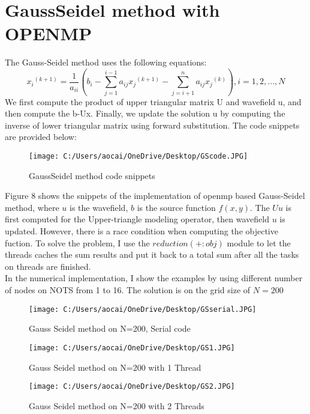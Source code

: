 \documentclass[12pt]{article}
\begin{document}
\section{GaussSeidel method with OPENMP}
The Gauss-Seidel method uses the following equations:
$${x_i}^{(k+1)} = \frac{1}{a_{ii}} \left( b_i - \sum_{j=1}^{i-1}a_{ij}{x_j}^{(k+1)} -\sum_{j=i+1}^{n}a_{ij}{x_j}^{(k)} \right), i= 1,2,...,N$$
We first compute the product of upper triangular matrix U and wavefield u, and then compute the b-Ux. Finally, we update the solution u by computing the inverse of lower triangular matrix using forward substitution. The code snippets are provided below:

\begin{figure}[H]
	\centering
	\texttt{[image: C:/Users/aocai/OneDrive/Desktop/GScode.JPG]}
	\caption[Optional caption]{GaussSeidel method code snippets}
	\label{fig:gs}
\end{figure}

Figure 8 shows the snippets of the implementation of openmp based Gauss-Seidel method, where $u$ is the wavefield, $b$ is the source function $f(x,y)$. The $Uu$ is first computed for the Upper-triangle modeling operator, then wavefield $u$ is updated. However, there is a race condition when computing the objective fuction. To solve the problem, I use the $reduction(+:obj)$ module to let the threads caches the sum results and put it back to a total sum after all the tasks on threads are finished.\\

In the numerical implementation, I show the examples by using different number of nodes on NOTS from 1 to 16. The solution is on the grid size of $N=200$

\begin{figure}[H]
	\centering
	\texttt{[image: C:/Users/aocai/OneDrive/Desktop/GSserial.JPG]}
	\caption[Optional caption]{Gauss Seidel method on N=200, Serial code}
	\label{fig:GSs}
\end{figure}

\begin{figure}[H]
	\centering
	\texttt{[image: C:/Users/aocai/OneDrive/Desktop/GS1.JPG]}
	\caption[Optional caption]{Gauss Seidel method on N=200 with 1 Thread}
	\label{fig:GS1}
\end{figure}

\begin{figure}[H]
	\centering
	\texttt{[image: C:/Users/aocai/OneDrive/Desktop/GS2.JPG]}
	\caption[Optional caption]{Gauss Seidel method on N=200 with 2 Threads}
	\label{fig:GS2}
\end{figure}
\end{document}
